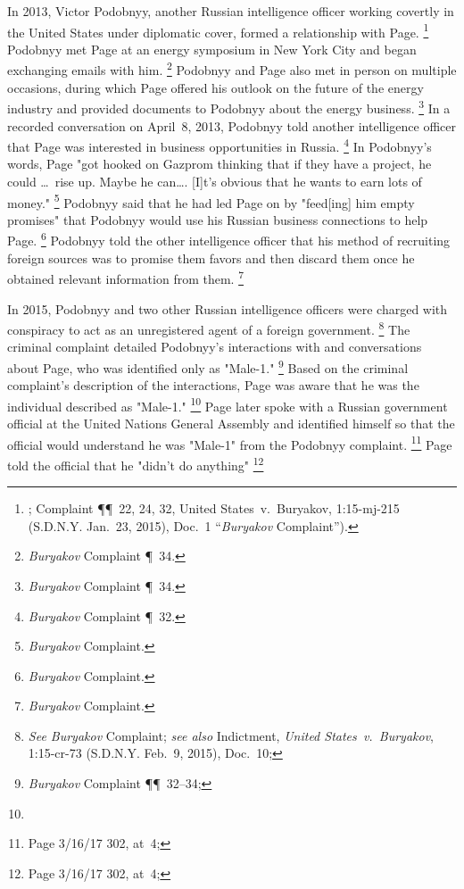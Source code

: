 In 2013, Victor Podobnyy, another Russian intelligence officer working covertly in the United States under diplomatic cover, formed a relationship with Page.%
\footnote{; Complaint \P\P~22, 24, 32, United States~v.\ Buryakov, 1:15-mj-215 (S.D.N.Y. Jan.~23, 2015), Doc.~1 ``\textit{Buryakov} Complaint'').}
Podobnyy met Page at an energy symposium in New York City and began exchanging emails with him.%
\footnote{\textit{Buryakov} Complaint \P~34.}
Podobnyy and Page also met in person on multiple occasions, during which Page offered his outlook on the future of the energy industry and provided documents to Podobnyy about the energy business.%
\footnote{\textit{Buryakov} Complaint \P~34.}
In a recorded conversation on April~8, 2013, Podobnyy told another intelligence officer that Page was interested in business opportunities in Russia.%
\footnote{\textit{Buryakov} Complaint \P~32.}
In Podobnyy's words, Page "got hooked on Gazprom thinking that if they have a project, he could \dots\ rise up. Maybe he can\dots. [I]t's obvious that he wants to earn lots of money."%
\footnote{\textit{Buryakov} Complaint.}
Podobnyy said that he had led Page on by "feed[ing] him empty promises" that Podobnyy would use his Russian business connections to help Page.%
\footnote{\textit{Buryakov} Complaint.}
Podobnyy told the other intelligence officer that his method of recruiting foreign sources was to promise them favors and then discard them once he obtained relevant information from them.%
\footnote{\textit{Buryakov} Complaint.}

In 2015, Podobnyy and two other Russian intelligence officers were charged with conspiracy to act as an unregistered agent of a foreign government.%
\footnote{\textit{See Buryakov} Complaint;
\textit{see also} Indictment, \textit{United States~v.\ Buryakov}, 1:15-cr-73 (S.D.N.Y. Feb.~9, 2015), Doc.~10;
}
The criminal complaint detailed Podobnyy's interactions with and conversations about Page, who was identified only as "Male-1."%
\footnote{\textit{Buryakov} Complaint \P\P~32--34; }
Based on the criminal complaint's description of the interactions, Page was aware that he was the individual described as "Male-1."%
\footnote{}
Page later spoke with a Russian government official at the United Nations General Assembly and identified himself so that the official would understand he was "Male-1" from the Podobnyy complaint. %
\footnote{Page 3/16/17 302, at~4; }
Page told the official that he "didn't do anything"
\footnote{Page 3/16/17 302, at~4; }

